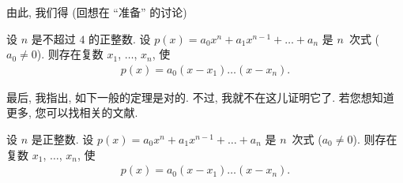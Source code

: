 \documentclass[../libro.tex]{subfiles}
\begin{document}
由此, 我们得 (回想在 ``准备'' 的讨论)

\begin{theorem}
    设 \(n\) 是不超过 \(4\) 的正整数.
    设 \(p(x) = a_0 x^n + a_1 x^{n-1} + \dots + a_n\)
    是 \(n\)~次式
    (\(a_0 \neq 0\)).
    则存在复数 \(x_1\), \(\dots\), \(x_n\),
    使
    \begin{align*}
        p(x) = a_0 (x - x_1) \dots (x - x_n).
    \end{align*}
\end{theorem}

最后, 我指出, 如下一般的定理是对的.
不过, 我就不在这儿证明它了.
若您想知道更多, 您可以找相关的文献.

\begin{theorem}[代数基本定理]
    设 \(n\) 是正整数.
    设 \(p(x) = a_0 x^n + a_1 x^{n-1} + \dots + a_n\)
    是 \(n\)~次式
    (\(a_0 \neq 0\)).
    则存在复数 \(x_1\), \(\dots\), \(x_n\),
    使
    \begin{align*}
        p(x) = a_0 (x - x_1) \dots (x - x_n).
    \end{align*}
\end{theorem}
\end{document}
